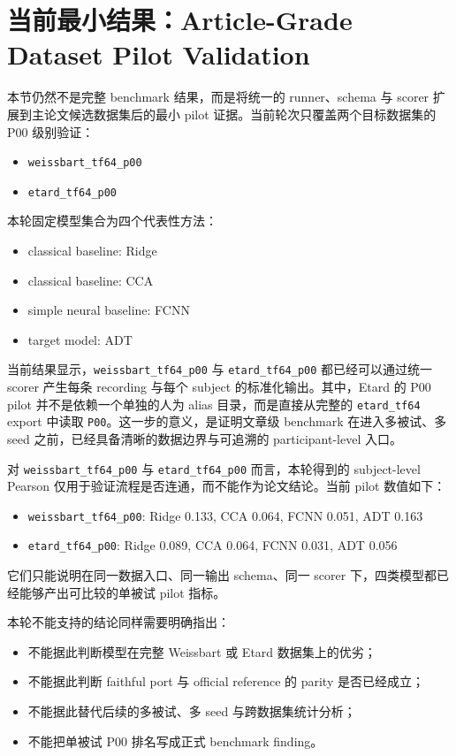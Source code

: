 \section{当前最小结果：Article-Grade Dataset Pilot Validation}

本节仍然不是完整 benchmark 结果，而是将统一的 runner、schema 与 scorer 扩展到主论文候选数据集后的最小 pilot 证据。当前轮次只覆盖两个目标数据集的 P00 级别验证：
\begin{itemize}
  \item \texttt{weissbart\_tf64\_p00}
  \item \texttt{etard\_tf64\_p00}
\end{itemize}

本轮固定模型集合为四个代表性方法：
\begin{itemize}
  \item classical baseline: Ridge
  \item classical baseline: CCA
  \item simple neural baseline: FCNN
  \item target model: ADT
\end{itemize}

当前结果显示，\texttt{weissbart\_tf64\_p00} 与 \texttt{etard\_tf64\_p00} 都已经可以通过统一 scorer 产生每条 recording 与每个 subject 的标准化输出。其中，Etard 的 P00 pilot 并不是依赖一个单独的人为 alias 目录，而是直接从完整的 \texttt{etard\_tf64} export 中读取 \texttt{P00}。这一步的意义，是证明文章级 benchmark 在进入多被试、多 seed 之前，已经具备清晰的数据边界与可追溯的 participant-level 入口。

对 \texttt{weissbart\_tf64\_p00} 与 \texttt{etard\_tf64\_p00} 而言，本轮得到的 subject-level Pearson 仅用于验证流程是否连通，而不能作为论文结论。当前 pilot 数值如下：
\begin{itemize}
  \item \texttt{weissbart\_tf64\_p00}: Ridge 0.133, CCA 0.064, FCNN 0.051, ADT 0.163
  \item \texttt{etard\_tf64\_p00}: Ridge 0.089, CCA 0.064, FCNN 0.031, ADT 0.056
\end{itemize}
它们只能说明在同一数据入口、同一输出 schema、同一 scorer 下，四类模型都已经能够产出可比较的单被试 pilot 指标。

本轮不能支持的结论同样需要明确指出：
\begin{itemize}
  \item 不能据此判断模型在完整 Weissbart 或 Etard 数据集上的优劣；
  \item 不能据此判断 faithful port 与 official reference 的 parity 是否已经成立；
  \item 不能据此替代后续的多被试、多 seed 与跨数据集统计分析；
  \item 不能把单被试 P00 排名写成正式 benchmark finding。
\end{itemize}

